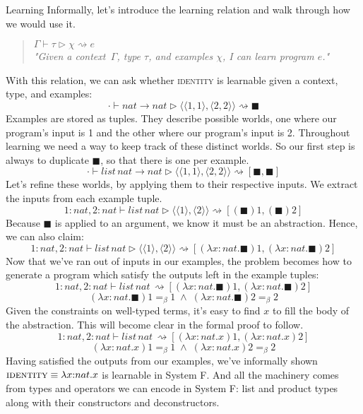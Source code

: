 \documentclass[11pt]{article}
\newcommand{\lam}{\lambda}
\theoremstyle{mytheoremstyle}
\begin{document}
\begin{section}{Learning}
Informally, let's introduce the learning relation and walk through how we would use it.
\begin{quote}
    \centering
    $\Gamma \vdash \tau \rhd \chi \rightsquigarrow e$\\
    \textit{"Given a context $\,\Gamma$, type $\tau$, and examples $\chi$, I can learn program $e$."}
\end{quote}
With this relation, we can ask whether \textsc{identity} is learnable given a context, type, and examples:
$$\cdot \vdash nat \!\to\! nat \rhd \langle\langle1,1\rangle,\langle2,2\rangle\rangle \rightsquigarrow \blacksquare$$
Examples are stored as tuples. They describe possible worlds, one where our program's input is 1 and the other where our program's input is 2. Throughout learning we need a way to keep track of these distinct worlds. So our first step is always to duplicate $\blacksquare$, so that there is one per example.
$$\cdot \vdash list \,nat \!\to\! nat \rhd \langle\langle1,1\rangle,\langle2,2\rangle\rangle \rightsquigarrow [\blacksquare, \blacksquare]$$
Let's refine these worlds, by applying them to their respective inputs. We extract the inputs from each example tuple.
$$1{:}nat, 2{:}nat \vdash list \,nat \rhd \langle\langle1\rangle,\langle2\rangle\rangle \rightsquigarrow [(\blacksquare)1, (\blacksquare)2]$$
Because $\blacksquare$ is applied to an argument, we know it must be an abstraction. Hence, we can also claim:
$$1{:}nat, 2{:}nat \vdash list \,nat \rhd \langle\langle1\rangle,\langle2\rangle\rangle \rightsquigarrow [(\lam x{:}nat.\blacksquare)1, (\lam x{:}nat.\blacksquare)2]$$
Now that we've ran out of inputs in our examples, the problem becomes how to generate a program which satisfy the outputs left in the example tuples:
$$1{:}nat, 2{:}nat \vdash list \,nat\, \rightsquigarrow [(\lam x{:}nat.\blacksquare)1, (\lam x{:}nat.\blacksquare)2]$$
$$(\lam x{:}nat.\blacksquare)1 =_\beta 1\;\land\;(\lam x{:}nat.\blacksquare)2=_\beta2$$
Given the constraints on well-typed terms, it's easy to find $x$ to fill the body of the abstraction. This will become clear in the formal proof to follow.
$$1{:}nat, 2{:}nat \vdash list \,nat\, \rightsquigarrow [(\lam x{:}nat.x)1, (\lam x{:}nat.x)2]$$
$$(\lam x{:}nat.x)1 =_\beta 1\;\land\;(\lam x{:}nat.x)2=_\beta2$$
Having satisfied the outputs from our examples, we've informally shown $\textsc{identity} \equiv \lam x{:}nat.x$ is learnable in System F. And all the machinery comes from types and operators we can encode in System F: list and product types along with their constructors and deconstructors.\\


\end{section}
\end{document}
